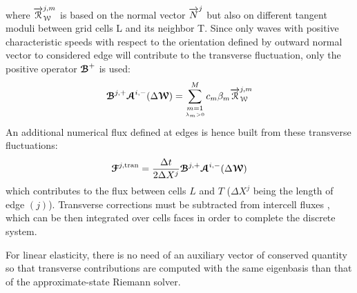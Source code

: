 where ${\overrightarrow{\mathcal{R}}}_{\mathcal{W}}^{j,m}$ is based on the normal vector ${\overrightarrow{N}}^j$ but also on different tangent moduli between grid cells L and its neighbor T. Since only waves with positive characteristic speeds with respect to the orientation defined by outward normal vector to considered edge will contribute to the transverse fluctuation, only the positive operator ${\boldsymbol{\mathcal{B}}}^+$ is used:
\begin{equation}
{\boldsymbol{\mathcal{B}}}^{j,+} {\boldsymbol{\mathcal{A}}}^{i,-}(\Delta {\boldsymbol{\mathcal{W}}}) = \sum_{\underset{\lambda_m >0}{m=1}}^{M} c_m \beta_m {\overrightarrow{\mathcal{R}}}_{\mathcal{W}}^{j,m} \label{eq:transverse_fluctuations}
\end{equation}
An additional numerical flux defined at edges is hence built from these transverse fluctuations:
\begin{equation}
{\boldsymbol{\mathcal{F}}}^{j,\text{tran}} = \frac{\Delta t}{2 \Delta X^j} {\boldsymbol{\mathcal{B}}}^{j,+} {\boldsymbol{\mathcal{A}}}^{i,-}(\Delta {\boldsymbol{\mathcal{W}}}) \label{eq:transverse_corrections}
\end{equation}
which contributes to the flux between cells $L$ and $T$ ($\Delta X^j$ being the length of edge $(j)$). 
Transverse corrections must be subtracted from intercell fluxes \cite[Ch.20]{Leveque}, which can be then integrated over cells faces in order to complete the discrete system.%


\begin{remark} 
  For linear elasticity, there is no need of an auxiliary vector of conserved quantity so that transverse contributions are computed with the same eigenbasis than that of the approximate-state Riemann solver.
\end{remark}

